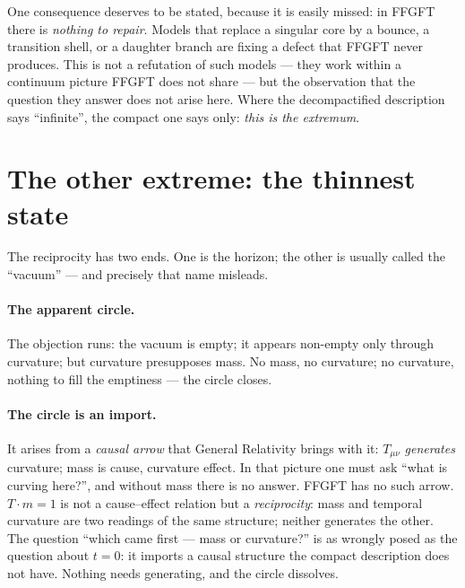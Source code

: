 One consequence deserves to be stated, because it is easily missed: in FFGFT there is
\emph{nothing to repair}. Models that replace a singular core by a bounce, a transition shell, or
a daughter branch are fixing a defect that FFGFT never produces. This is not a refutation of such
models --- they work within a continuum picture FFGFT does not share --- but the observation that
the question they answer does not arise here. Where the decompactified description says
\enquote{infinite}, the compact one says only: \emph{this is the extremum}.

\section{The other extreme: the thinnest state}

The reciprocity has two ends. One is the horizon; the other is usually called the
\enquote{vacuum} --- and precisely that name misleads.

\paragraph{The apparent circle.} The objection runs: the vacuum is empty; it appears non-empty
only through curvature; but curvature presupposes mass. No mass, no curvature; no curvature,
nothing to fill the emptiness --- the circle closes.

\paragraph{The circle is an import.} It arises from a \emph{causal arrow} that General Relativity
brings with it: $T_{\mu\nu}$ \emph{generates} curvature; mass is cause, curvature effect. In that
picture one must ask \enquote{what is curving here?}, and without mass there is no answer. FFGFT
has no such arrow. $T\cdot m = 1$ is not a cause--effect relation but a \emph{reciprocity}: mass
and temporal curvature are two readings of the same structure; neither generates the other. The
question \enquote{which came first --- mass or curvature?} is as wrongly posed as the question
about $t=0$: it imports a causal structure the compact description does not have. Nothing needs
generating, and the circle dissolves.

